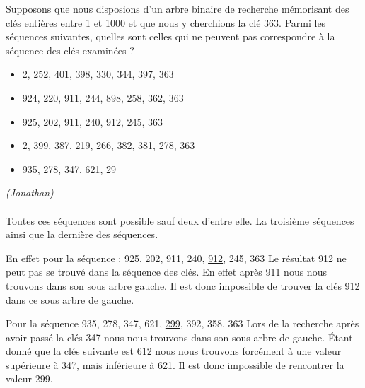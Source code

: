 
Supposons que nous disposions d'un arbre binaire de recherche mémorisant des clés entières entre 1 et 1000 et que nous y cherchions la clé 363. Parmi les séquences suivantes, quelles sont celles qui ne peuvent pas correspondre à la séquence des clés examinées ?

\begin{itemize}

\item 2, 252, 401, 398, 330, 344, 397, 363
\item 924, 220, 911, 244, 898, 258, 362, 363
\item 925, 202, 911, 240, 912, 245, 363
\item 2, 399, 387, 219, 266, 382, 381, 278, 363
\item 935, 278, 347, 621, 29

\end{itemize}
\textit{(Jonathan)} \\
\\ Toutes ces séquences sont possible sauf deux d'entre elle.
La troisième séquences ainsi que la dernière des séquences.

En effet pour la séquence : 925, 202, 911, 240, \underline{912}, 245, 363
Le résultat 912 ne peut pas se trouvé dans la séquence des clés. En effet après 911 nous nous trouvons dans son sous arbre gauche. Il est donc impossible de trouver la clés 912 dans ce sous arbre de gauche.


Pour la séquence 935, 278, 347, 621, \underline{299}, 392, 358, 363
Lors de la recherche après avoir passé la clés 347 nous nous trouvons dans son sous arbre de gauche. Étant donné que la clés suivante est 612 nous nous trouvons forcément à une valeur supérieure à 347, mais inférieure à 621. Il est donc impossible de rencontrer la valeur 299.